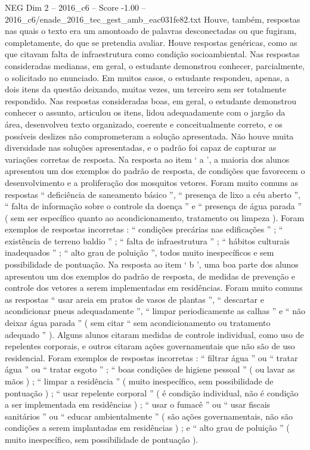 \begin{textsample}{NEG Dim 2 – 2016\_c6 – Score -1.00 – 2016\_c6/enade\_2016\_tec\_gest\_amb\_eac031fe82.txt}
Houve, também, respostas nas quais o texto era um amontoado de palavras desconectadas ou que fugiram, completamente, do que se pretendia avaliar.
Houve respostas genéricas, como as que citavam falta de infraestrutura como condição socioambiental.
Nas respostas consideradas medianas, em geral, o estudante demonstrou conhecer, parcialmente, o solicitado no enunciado.
Em muitos casos, o estudante respondeu, apenas, a dois itens da questão deixando, muitas vezes, um terceiro sem ser totalmente respondido.
Nas respostas consideradas boas, em geral, o estudante demonstrou conhecer o assunto, articulou os itens, lidou adequadamente com o jargão da área, desenvolveu texto organizado, coerente e conceitualmente correto, e os possíveis deslizes não comprometeram a solução apresentada.
Não houve muita diversidade nas soluções apresentadas, e o padrão foi capaz de capturar as variações corretas de resposta.
Na resposta ao item ‘ a ’, a maioria dos alunos apresentou um dos exemplos do padrão de resposta, de condições que favorecem o desenvolvimento e a proliferação dos mosquitos vetores.
Foram muito comuns as respostas “ deficiência de saneamento básico ”, “ presença de lixo a céu aberto ”, “ falta de informação sobre o controle da doença ” e “ presença de água parada ” ( sem ser específico quanto ao acondicionamento, tratamento ou limpeza ).
Foram exemplos de respostas incorretas : “ condições precárias nas edificações ” ; “ existência de terreno baldio ” ; “ falta de infraestrutura ” ; “ hábitos culturais inadequados ” ; “ alto grau de poluição ”, todos muito inespecíficos e sem possibilidade de pontuação.
Na resposta ao item ‘ b ’, uma boa parte dos alunos apresentou um dos exemplos do padrão de resposta, de medidas de prevenção e controle dos vetores a serem implementadas em residências.
Foram muito comuns as respostas “ usar areia em pratos de vasos de plantas ”, “ descartar e acondicionar pneus adequadamente ”, “ limpar periodicamente as calhas ” e “ não deixar água parada ” ( sem citar “ sem acondicionamento ou tratamento adequado ” ).
Alguns alunos citaram medidas de controle individual, como uso de repelentes corporais, e outros citaram ações governamentais que não são de uso residencial.
Foram exemplos de respostas incorretas : “ filtrar água ” ou “ tratar água ” ou “ tratar esgoto ” ; “ boas condições de higiene pessoal ” ( ou lavar as mãos ) ; “ limpar a residência ” ( muito inespecífico, sem possibilidade de pontuação ) ; “ usar repelente corporal ” ( é condição individual, não é condição a ser implementada em residências ) ; “ usar o fumacê ” ou “ usar fiscais sanitários ” ou “ educar ambientalmente ” ( são ações governamentais, não são condições a serem implantadas em residências ) ; e “ alto grau de poluição ” ( muito inespecífico, sem possibilidade de pontuação ).

\end{textsample}
